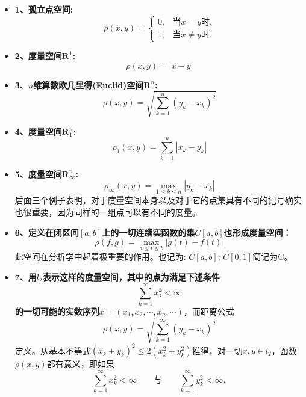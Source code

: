\begin{itemize}
	\item \textbf{1、孤立点空间:}
	\begin{equation*}
	\rho(x,y)=
	\begin{cases}
	0, &\mbox{当$x=y$时,}\\
	1, &\mbox{当$x\neq y$时.}
	\end{cases}
	\end{equation*}
	\item \textbf{2、度量空间$\mathbf{R}^1$:}
	\begin{equation*}
	\rho(x,y)=|x-y|
	\end{equation*}
	\item \textbf{3、$n$维算数欧几里得(Euclid)空间$\mathbf{R}^n$:}
	\begin{equation}
	\label{eq2.1}
	\rho(x,y)=\sqrt{\sum\limits_{k=1}^{n}(y_k-x_k)^2}
	\end{equation}
	\item \textbf{4、度量空间$\mathbf{R}^n_1$:}
	\begin{equation}
	\label{eq2.5}
	\rho_1(x,y)=\sum\limits_{k=1}^{n}|x_k-y_k|
	\end{equation}
	\item \textbf{5、度量空间$\mathbf{R}^n_{\infty}$:}
	\begin{equation}
	\label{eq2.6}
	\rho_{\infty}(x,y) = \max\limits_{1 \leqslant k \leqslant n}|y_k-x_k|
	\end{equation}
	后面三个例子表明，对于度量空间本身以及对于它的点集具有不同的记号确实也很重要，因为同样的一组点可以有不同的度量。
	\item \textbf{6、定义在闭区间$[a,b]$上的一切连续实函数的集$C[a,b]$也形成度量空间：}
	\begin{equation}
	\label{eq2.7}
	\rho(f,g)=\max\limits_{a \leqslant t \leqslant b}|g(t)-f(t)|
	\end{equation}
	此空间在分析学中起着极重要的作用。也记为: $C[a,b]$; $C[0,1]$简记为C。
	\item \textbf{7、用$l_2$表示这样的度量空间，其中的点为满足下述条件}
	\[
	\sum\limits_{k=1}^{\infty}x_2^k < \infty
	\]
	\textbf{的一切可能的实数序列$x=(x_1,x_2,\cdots,x_n,\cdots)$}，而距离公式
	\begin{equation}
	\label{2.8}
	\rho(x,y)=\sqrt{\sum\limits_{k=1}^{\infty}(y_k-x_k)^2}
	\end{equation}
	定义。从基本不等式$(x_k \pm y_k)^2 \leqslant 2(x_k^2+y_k^2)$推得，对一切$x,y \in l_2$，函数$\rho(x,y)$都有意义，即如果
	\[
	\sum\limits_{k=1}^{\infty}x_k^2 < \infty \qquad \text{与} \qquad \sum\limits_{k=1}^{\infty}y_k^2 < \infty,
\]
\end{itemize}
